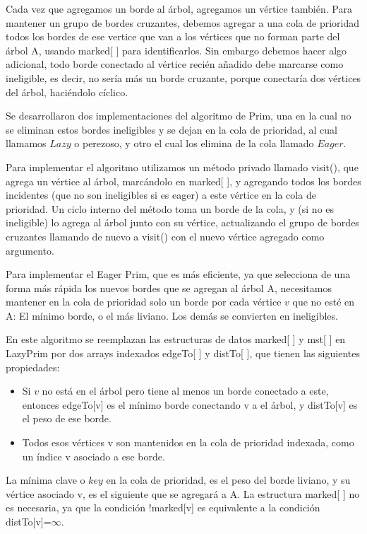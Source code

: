 \documentclass[a4paper, 11pt]{report}
\begin{document}
Cada vez que agregamos un borde al árbol, agregamos un vértice también. Para mantener un grupo de bordes cruzantes, debemos agregar a una cola de prioridad todos los bordes de ese vertice que van a los vértices que no forman parte del árbol A, usando marked[ ] para identificarlos. Sin embargo debemos hacer algo adicional, todo borde conectado al vértice recién añadido debe marcarse como ineligible, es decir, no sería más un borde cruzante, porque conectaría dos vértices del árbol, haciéndolo cíclico.

Se desarrollaron dos implementaciones del algoritmo de Prim, una en la cual no se eliminan estos bordes ineligibles y se dejan en la cola de prioridad, al cual llamamos $Lazy$ o perezoso, y otro el cual los elimina de la cola llamado $Eager$. 

Para implementar el algoritmo utilizamos un método privado llamado visit(), que agrega un vértice al árbol, marcándolo en marked[ ], y agregando todos los bordes incidentes (que no son ineligibles si es eager) a este vértice en la cola de prioridad. Un ciclo interno del método toma un borde de la cola, y (si no es ineligible) lo agrega al árbol junto con su vértice, actualizando el grupo de bordes cruzantes llamando de nuevo a visit() con el nuevo vértice agregado como argumento. 

Para implementar el Eager Prim, que es más eficiente, ya que selecciona de una forma más rápida los nuevos bordes que se agregan al árbol A, necesitamos mantener en la cola de prioridad solo un borde por cada vértice $v$ que no esté en A: El mínimo borde, o el más liviano. Los demás se convierten en ineligibles.

En este algoritmo se reemplazan las estructuras de datos marked[ ] y mst[ ] en LazyPrim por dos arrays indexados edgeTo[ ] y distTo[ ], que tienen las siguientes propiedades:

\begin{itemize}
\item Si $v$ no está en el árbol pero tiene al menos un borde conectado a este, entonces edgeTo[v] es el mínimo borde conectando v a el árbol, y distTo[v] es el peso de ese borde.
\item Todos esos vértices v son mantenidos en la cola de prioridad indexada, como un índice v asociado a ese borde.
\end{itemize} 
La mínima clave o $key$ en la cola de prioridad, es el peso del borde liviano, y su vértice asociado v, es el siguiente que se agregará a A. La estructura marked[ ] no es necesaria, ya que la condición !marked[v] es equivalente a la condición distTo[v]=$\infty$.   
\end{document}
